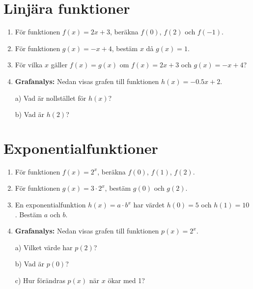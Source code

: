 \documentclass[a4paper,11pt]{article}
\begin{document}
\section{Linjära funktioner}
\begin{enumerate}[label=\textbf{\arabic*.}]
    \item För funktionen $f(x) = 2x + 3$, beräkna $f(0)$, $f(2)$ och $f(-1)$.
    \item För funktionen $g(x) = -x + 4$, bestäm $x$ då $g(x) = 1$.
    \item För vilka $x$ gäller $f(x) = g(x)$ om $f(x) = 2x + 3$ och $g(x) = -x + 4$?
    \item \textbf{Grafanalys:} Nedan visas grafen till funktionen $h(x) = -0.5x + 2$.
    \begin{center}
    \end{center}
    a) Vad är nollstället för $h(x)$?
    
    b) Vad är $h(2)$?
\end{enumerate}
\newpage
\section{Exponentialfunktioner}
\begin{enumerate}[label=\textbf{\arabic*.}]
    \item För funktionen $f(x) = 2^x$, beräkna $f(0)$, $f(1)$, $f(2)$.
    \item För funktionen $g(x) = 3 \cdot 2^x$, bestäm $g(0)$ och $g(2)$.
    \item En exponentialfunktion $h(x) = a \cdot b^x$ har värdet $h(0) = 5$ och $h(1) = 10$. Bestäm $a$ och $b$.
    \item \textbf{Grafanalys:} Nedan visas grafen till funktionen $p(x) = 2^x$.
    \begin{center}
    \end{center}
    a) Vilket värde har $p(2)$?
    
    b) Vad är $p(0)$?
    
    c) Hur förändras $p(x)$ när $x$ ökar med 1?
\end{enumerate}
\newpage
\end{document}
